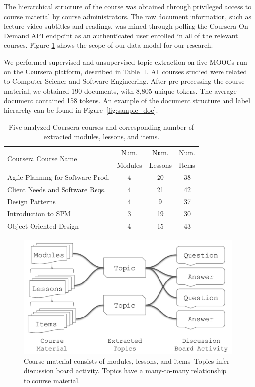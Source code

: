 \documentclass[sigconf, nonacm=true]{acmart}
\begin{document}
The hierarchical structure of the course was obtained through privileged access to course material by course administrators.
The raw document information, such as lecture video subtitles and readings, was mined through polling the Coursera On-Demand API endpoint as an authenticated user enrolled in all of the relevant courses.
Figure \ref{fig:data_model} shows the scope of our data model for our research.

We performed supervised and unsupervised topic extraction on five
MOOCs run on the Coursera platform, described in Table~\ref{tab:uofa-courses}.
All courses studied were related to Computer Science and Software Engineering.
After pre-processing the course material, we obtained 190 documents, with 8,805 unique tokens.
The average document contained 158 tokens.
An example of the document structure and label hierarchy can be found in Figure~\ref{fig:sample_doc}.

\begin{table}
\begin{tabularx}{\columnwidth}{@{}p{}ccc@{}}
    \toprule
    \multirow{2}{*}{Coursera Course Name} & Num. & Num. & Num. \\
    & Modules & Lessons & Items \\
    \midrule
    Agile Planning for Software Prod. & 4 & 20 & 38 \\
    Client Needs and Software Reqs. & 4 & 21 & 42 \\
    Design Patterns & 4 & 9 & 37 \\
    Introduction to SPM & 3 & 19 & 30 \\
    Object Oriented Design & 4 & 15 & 43 \\
    \bottomrule
\end{tabularx}
\caption{Five analyzed Coursera courses and corresponding number of extracted modules, lessons, and items.}
\label{tab:uofa-courses}
\end{table}

\begin{figure}
    \centering
    \includegraphics[width=\columnwidth]{figures/data_model}
    \caption{Course material consists of modules, lessons, and items. Topics infer discussion board activity. Topics have a many-to-many relationship to course material.}
    \label{fig:data_model}
\end{figure}
\end{document}
